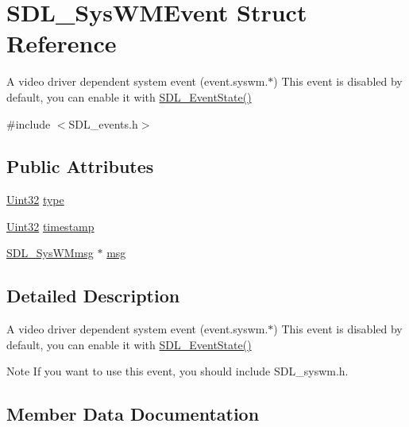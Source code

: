 \hypertarget{struct_s_d_l___sys_w_m_event}{}\section{S\+D\+L\+\_\+\+Sys\+W\+M\+Event Struct Reference}
\label{struct_s_d_l___sys_w_m_event}


A video driver dependent system event (event.\+syswm.$\ast$) This event is disabled by default, you can enable it with \mbox{\hyperlink{_s_d_l__events_8h_afb772893e1c46f186fa39a4defe76df3}{S\+D\+L\+\_\+\+Event\+State()}}  




{\ttfamily \#include $<$S\+D\+L\+\_\+events.\+h$>$}

\subsection*{Public Attributes}
\begin{DoxyCompactItemize}
\item 
\mbox{\hyperlink{_s_d_l__stdinc_8h_add440eff171ea5f55cb00c4a9ab8672d}{Uint32}} \mbox{\hyperlink{struct_s_d_l___sys_w_m_event_a84697e96cb16bf6a570e10b5bfdcd392}{type}}
\item 
\mbox{\hyperlink{_s_d_l__stdinc_8h_add440eff171ea5f55cb00c4a9ab8672d}{Uint32}} \mbox{\hyperlink{struct_s_d_l___sys_w_m_event_a5d3cb97006d99b620c2671c27bd82c06}{timestamp}}
\item 
\mbox{\hyperlink{struct_s_d_l___sys_w_mmsg}{S\+D\+L\+\_\+\+Sys\+W\+Mmsg}} $\ast$ \mbox{\hyperlink{struct_s_d_l___sys_w_m_event_ad5e3dc68aa15582cd0641847d41c74e8}{msg}}
\end{DoxyCompactItemize}


\subsection{Detailed Description}
A video driver dependent system event (event.\+syswm.$\ast$) This event is disabled by default, you can enable it with \mbox{\hyperlink{_s_d_l__events_8h_afb772893e1c46f186fa39a4defe76df3}{S\+D\+L\+\_\+\+Event\+State()}} 

\begin{DoxyNote}{Note}
If you want to use this event, you should include S\+D\+L\+\_\+syswm.\+h. 
\end{DoxyNote}


\subsection{Member Data Documentation}
\mbox{\label{struct_s_d_l___sys_w_m_event_ad5e3dc68aa15582cd0641847d41c74e8}} 
